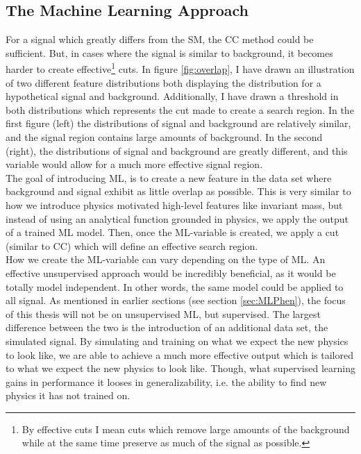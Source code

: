 \subsection{The Machine Learning Approach}
For a signal which greatly differs from the \ac{SM}, the \ac{CC} method could be sufficient. But, in 
cases where the signal is similar to background, it becomes harder to create effective\footnote{By effective
cuts I mean cuts which remove large amounts of the background while at the same time preserve as much of 
the signal as possible.} cuts. In figure \ref{fig:overlap}, I have drawn an illustration of two different feature distributions both 
displaying the distribution for a hypothetical signal and background. Additionally, I have drawn a 
threshold in both distributions which represents the cut made to create a search region. In the first 
figure (left) the distributions of signal and background are relatively similar, and the signal region 
contains large amounts of background. In the second (right), the distributions of signal and background 
are greatly different, and this variable would allow for a much more effective signal region. 
\\
The goal of introducing \ac{ML}, is to create a new feature in the data set where background and signal
exhibit as little overlap as possible. This is very similar to how we introduce physics motivated high-level
features like invariant mass, but instead of using an analytical function grounded in physics, 
we apply the output of a trained \ac{ML} model. Then, once the \ac{ML}-variable is created, 
we apply a cut (similar to \ac{CC}) which will define an effective search region. 
\\
How we create the \ac{ML}-variable can vary depending on the type of \ac{ML}. An effective unsupervised approach
would be incredibly beneficial, as it would be totally model independent. In other words, the same model could be applied 
to all signal. As mentioned in earlier sections (see section \ref{sec:MLPhen}), the focus of this thesis will not be on 
unsupervised \ac{ML}, but supervised. The largest difference between the two is the introduction of an additional data set,
the simulated signal. By simulating and training on what we expect the new physics to look like, we are able to achieve a much more 
effective output which is tailored to what we expect the new physics to look like. Though, what supervised learning gains in performance
it looses in generalizability, i.e. the ability to find new physics it has not trained on.